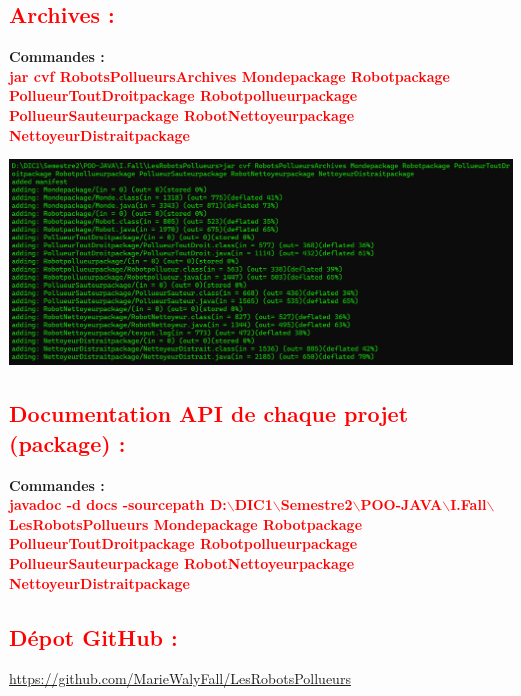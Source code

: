 \documentclass{article}
\begin{document}
\textcolor{red}{\section*{Archives :}}
\textbf{\large{Commandes : }}\\
\textcolor{red}{\textbf{jar cvf RobotsPollueursArchives Mondepackage Robotpackage PollueurToutDroitpackage Robotpollueurpackage PollueurSauteurpackage RobotNettoyeurpackage NettoyeurDistraitpackage}}

\includegraphics[scale=0.4]{../images/archive.png}\\

\textcolor{red}{\section*{Documentation	API	de	chaque	projet	(package) :}}
\textbf{\large{Commandes : }}\\
\textcolor{red}{\textbf{javadoc -d docs -sourcepath D:$\backslash$DIC1$\backslash$Semestre2$\backslash$POO-JAVA$\backslash$I.Fall$\backslash$LesRobotsPollueurs Mondepackage Robotpackage PollueurToutDroitpackage Robotpollueurpackage PollueurSauteurpackage RobotNettoyeurpackage NettoyeurDistraitpackage}}

\textcolor{red}{\section*{Dépot GitHub :}}
\url{https://github.com/MarieWalyFall/LesRobotsPollueurs}
\end{document}
